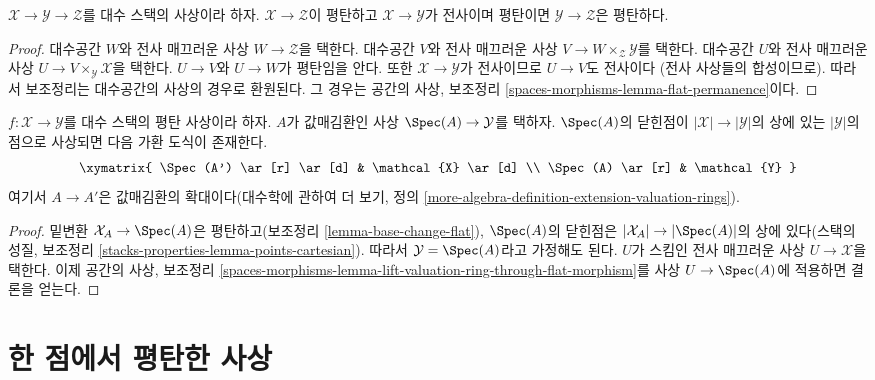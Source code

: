 \begin{lemma}
\label{lemma-flat-permanence}
$\mathcal{X} \to \mathcal{Y} \to \mathcal{Z}$를 대수 스택의 사상이라
하자. $\mathcal{X} \to \mathcal{Z}$이 평탄하고
$\mathcal{X} \to \mathcal{Y}$가 전사이며 평탄이면
$\mathcal{Y} \to \mathcal{Z}$은 평탄하다.
\end{lemma}

\begin{proof}
대수공간 $W$와 전사 매끄러운 사상 $W \to \mathcal{Z}$을 택한다.
대수공간 $V$와 전사 매끄러운 사상
$V \to W \times_\mathcal{Z} \mathcal{Y}$를 택한다. 대수공간 $U$와
전사 매끄러운 사상 $U \to V \times_\mathcal{Y} \mathcal{X}$을 택한다.
$U \to V$와 $U \to W$가 평탄임을 안다. 또한
$\mathcal{X} \to \mathcal{Y}$가 전사이므로 $U \to V$도 전사이다
(전사 사상들의 합성이므로). 따라서 보조정리는 대수공간의 사상의
경우로 환원된다. 그 경우는 공간의 사상, 보조정리
\ref{spaces-morphisms-lemma-flat-permanence}이다.
\end{proof}

\begin{lemma}
\label{lemma-lift-valuation-ring-through-flat-morphism}
$f : \mathcal{X} \to \mathcal{Y}$를 대수 스택의 평탄 사상이라 하자.
$A$가 값매김환인 사상 $\Spec(A) \to \mathcal{Y}$를 택하자.
$\Spec(A)$의 닫힌점이 $|\mathcal{X|} \to |\mathcal{Y}|$의 상에 있는
$|\mathcal{Y}|$의 점으로 사상되면 다음 가환 도식이 존재한다.%
$$
\xymatrix{
\Spec(A') \ar[r] \ar[d] & \mathcal{X} \ar[d] \\
\Spec(A) \ar[r] & \mathcal{Y}
}
$$
여기서 $A \to A'$은 값매김환의 확대이다(대수학에 관하여 더 보기,
정의 \ref{more-algebra-definition-extension-valuation-rings}).
\end{lemma}

\begin{proof}
밑변환 $\mathcal{X}_A \to \Spec(A)$은 평탄하고(보조정리
\ref{lemma-base-change-flat}), $\Spec(A)$의 닫힌점은
$|\mathcal{X}_A| \to |\Spec(A)|$의 상에 있다(스택의 성질, 보조정리
\ref{stacks-properties-lemma-points-cartesian}). 따라서
$\mathcal{Y} = \Spec(A)$라고 가정해도 된다. $U$가 스킴인 전사 매끄러운
사상 $U \to \mathcal{X}$을 택한다. 이제 공간의 사상, 보조정리
\ref{spaces-morphisms-lemma-lift-valuation-ring-through-flat-morphism}를
사상 $U \to \Spec(A)$에 적용하면 결론을 얻는다.
\end{proof}







\section{한 점에서 평탄한 사상}
\label{section-flat-at-point}


